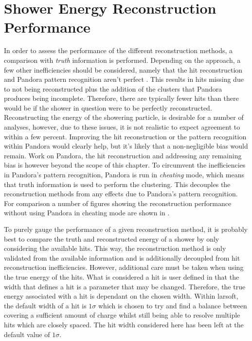 \newpage
\section{Shower Energy Reconstruction Performance}

In order to assess the performance of the different reconstruction methods, a comparison with \textit{truth} information is performed. Depending on the approach, a few other inefficiencies should be considered, namely that the hit reconstruction and Pandora pattern recognition aren't perfect \cite{Pandora_paper}. This results in hits missing due to not being reconstructed plus the addition of the clusters that Pandora produces being incomplete. Therefore, there are typically fewer hits than there would be if the shower in question were to be perfectly reconstructed. Reconstructing the energy of the showering particle, is desirable for a number of analyses, however, due to these issues, it is not realistic to expect agreement to within a few percent. Improving the hit reconstruction or the pattern recognition within Pandora would clearly help, but it's likely that a non-negligible bias would remain. Work on Pandora, the hit reconstruction and addressing any remaining bias is however beyond the scope of this chapter. To circumvent the inefficiencies in Pandora's pattern recognition, Pandora is run in \textit{cheating} mode, which means that truth information is used to perform the clustering. This decouples the reconstruction methods from any effects due to Pandora's pattern recognition. For comparison a number of figures showing the reconstruction performance without using Pandora in cheating mode are shown in .

To purely gauge the performance of a given reconstruction method, it is probably best to compare the truth and reconstructed energy of a shower by only considering the available hits. This way, the reconstruction method is only validated from the available information and is additionally decoupled from hit reconstruction inefficiencies. However, additional care must be taken when using the true energy of the hits. What is considered a hit is user defined in that the width that defines a hit is a parameter that may be changed. Therefore, the true energy associated with a hit is dependant on the chosen width. Within \gls{larsoft}, the default width of a hit is $1\sigma$ which is chosen to try and find a balance between covering a sufficient amount of charge whilst still being able to resolve multiple hits which are closely spaced. The hit width considered here has been left at the default value of $1\sigma$. 

